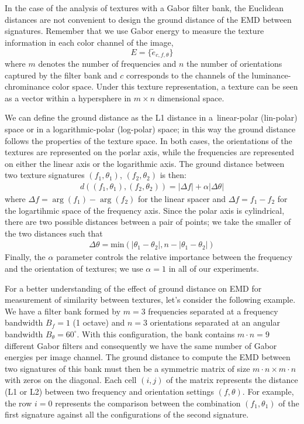 In the case of the analysis of textures with a Gabor filter bank, the Euclidean distances are not convenient to design the ground distance of the EMD between signatures. Remember that we use Gabor energy to measure the texture information in each color channel of the image,
\begin{equation}\label{eq:feature_space}
	E = \{\widetilde{e}_{c, f, \theta}\}
\end{equation}
where $m$ denotes the number of frequencies and $n$ the number of orientations captured by the filter bank and $c$ corresponds to the channels of the luminance-chrominance color space. Under this texture representation, a texture can be seen as a vector within a hypersphere in $m \times n$ dimensional space.

We can define the ground distance as the L1 distance in a\ linear-polar (lin-polar) space or in a logarithmic-polar (log-polar) space; in this way the ground distance follows the properties of the texture space. In both cases, the orientations of the textures are represented on the porlar axis, while the frequencies are represented on either the linear axis or the logarithmic axis. The ground distance between two texture signatures $(f_1, \theta_1)$, $(f_2, \theta_2)$ is then:
\begin{eqnarray} \label{eq:emd_lin_log_polar}
	d((f_1, \theta_1), (f_2, \theta_2)) = |\Delta f| + \alpha |\Delta \theta|
\end{eqnarray}
where $\Delta f = \arg{(f_1)} - \arg{(f_2)}$ for the linear spacer and $\Delta f = f_1 - f_2$ for the logartihmic space of the frequency axis. Since the polar axis is cylindrical, there are two possible distances between a pair of points; we take the smaller of the two distances such that
\begin{eqnarray} \label{eq:emd_ground_dist_polar_axis}
	\Delta \theta = \mathrm{min}(|\theta_1-\theta_2|, n-|\theta_1-\theta_2|) \nonumber
\end{eqnarray}
Finally, the $\alpha$ parameter controls the relative importance between the frequency and the orientation of textures; we use $\alpha=1$ in all of our experiments.

For a better understanding of the effect of ground distance on EMD for measurement of similarity between textures, let's consider the following example. We have a filter bank formed by $m = 3$ frequencies separated at a frequency bandwidth $B_f = 1$ (1 octave) and $n = 3$ orientations separated at an angular bandwidth $B_\theta = 60^\circ$. With this configuration, the bank contains $ m \cdot n = 9 $ different Gabor filters and consequently we have the same number of Gabor energies per image channel. The ground distance to compute the EMD between two signatures of this bank must then be a symmetric matrix of size $ m \cdot n \times m \cdot n $ with zeros on the diagonal. Each cell $(i, j)$ of the matrix represents the distance (L1 or L2) between two frequency and orientation settings $(f,\theta)$. For example, the row $i = 0$ represents the comparison between the combination $(f_1, \theta_1)$ of the first signature against all the configurations of the second signature.

